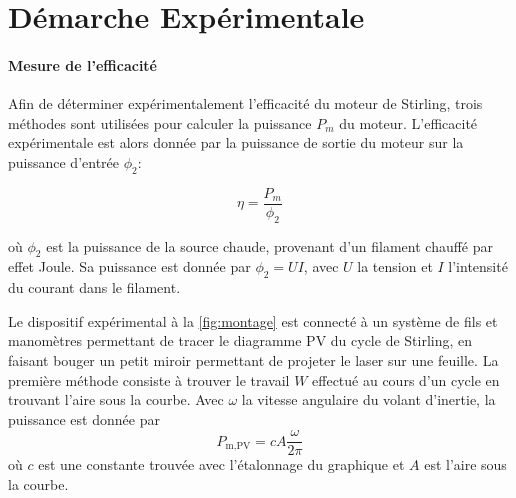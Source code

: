 \section{Démarche Expérimentale}

\paragraph{Mesure de l'efficacité}
Afin de déterminer expérimentalement l'efficacité du moteur de Stirling, trois méthodes sont utilisées pour calculer la puissance \(P_m\) du moteur. L'efficacité expérimentale est alors donnée par la puissance de sortie du moteur sur la puissance d'entrée \(\phi_2\):

\begin{equation}
    \eta = \frac{P_m}{\phi_2}
    \label{eq:efficacite}
\end{equation}

où \(\phi_2\) est la puissance de la source chaude, provenant d'un filament chauffé par effet Joule. Sa puissance est donnée par \(\phi_2 = UI\), avec \(U\) la tension et \(I\) l'intensité du courant dans le filament.

Le dispositif expérimental à la \autoref{fig:montage} est connecté à un système de fils et manomètres permettant de tracer le diagramme PV du cycle de Stirling, en faisant bouger un petit miroir permettant de projeter le laser sur une feuille. La première méthode consiste à trouver le travail \(W\) effectué au cours d'un cycle en trouvant l'aire sous la courbe. Avec \(\omega\) la vitesse angulaire du volant d'inertie, la puissance est donnée par 
\begin{equation}
    P_\textrm{m,PV} = c A \frac{\omega}{2 \pi}
    \label{eq:pm_pv}
\end{equation}
où \(c\) est une constante trouvée avec l'étalonnage du graphique et \(A\) est l'aire sous la courbe.


